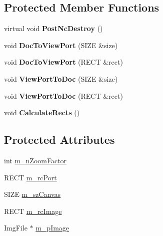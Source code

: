 \subsection*{Protected Member Functions}
\begin{DoxyCompactItemize}
\item 
\mbox{\label{class_basic_view_aafdbf24eb9c7260ac8c51c05839b5dd8}} 
virtual void {\bfseries Post\+Nc\+Destroy} ()
\item 
\mbox{\label{class_basic_view_a2fa0648d41595e81c91cc58dbea5488f}} 
void {\bfseries Doc\+To\+View\+Port} (S\+I\+ZE \&size)
\item 
\mbox{\label{class_basic_view_a948bff6deaaa0d5a546dd7bb6c063d79}} 
void {\bfseries Doc\+To\+View\+Port} (R\+E\+CT \&rect)
\item 
\mbox{\label{class_basic_view_aba477b0400f6152ee6971142eba519a6}} 
void {\bfseries View\+Port\+To\+Doc} (S\+I\+ZE \&size)
\item 
\mbox{\label{class_basic_view_abf35d7d7d7ae89a8e5ff607111be6167}} 
void {\bfseries View\+Port\+To\+Doc} (R\+E\+CT \&rect)
\item 
\mbox{\label{class_basic_view_a896292cd23b8fa853fcf1451e5949d33}} 
void {\bfseries Calculate\+Rects} ()
\end{DoxyCompactItemize}
\subsection*{Protected Attributes}
\begin{DoxyCompactItemize}
\item 
int \mbox{\hyperlink{class_basic_view_a45c68c0cbfcd5275bed1d76af7272c22}{m\+\_\+n\+Zoom\+Factor}}
\item 
R\+E\+CT \mbox{\hyperlink{class_basic_view_ae0c220c7659c120bae97c43e5e79cf3f}{m\+\_\+rc\+Port}}
\item 
S\+I\+ZE \mbox{\hyperlink{class_basic_view_a576f84883374c4ca07a7071967434396}{m\+\_\+sz\+Canvas}}
\item 
R\+E\+CT \mbox{\hyperlink{class_basic_view_a9d8a549c1bcfc0e077f3d68c326a7cab}{m\+\_\+rc\+Image}}
\item 
Img\+File $\ast$ \mbox{\hyperlink{class_basic_view_a4b8c2fb4f3b0d69dcc227947b8933629}{m\+\_\+p\+Image}}
\end{DoxyCompactItemize}


